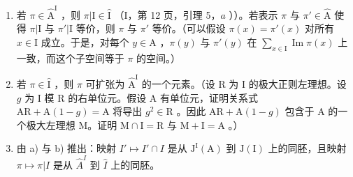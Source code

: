\begin{enumerate}
\def\labelenumi{\alph{enumi})}
\item
  若 \(\pi \in \widehat{\mathrm{A}}^{\mathrm{I}}\) ，则 \(\pi | \mathrm{I} \in \widehat{\mathrm{I}}\) （I，第 12 页，引理 5，\(a\) ））。若表示 \(\pi\) 与 \(\pi' \in \widehat{\mathrm{A}}\) 使得 \(\pi | \mathrm{I}\) 与 \(\pi'|\mathrm{I}\) 等价，则 \(\pi\) 与 \(\pi'\) 等价。（可以假设 \(\pi(x) = \pi'(x)\) 对所有 \(x \in \mathrm{I}\) 成立。于是，对每个 \(y \in \mathrm{A}\) ，\(\pi(y)\) 与 \(\pi'(y)\) 在 \(\sum_{x \in \mathrm{I}} \operatorname{Im} \pi(x)\) 上一致，而这个子空间等于 \(\pi\) 的空间。）
\item
  若 \(\pi \in \widehat{\mathrm{I}}\) ，则 \(\pi\) 可扩张为 \(\widehat{\mathrm{A}}^{\mathrm{I}}\) 的一个元素。（设 R 为 I 的极大正则左理想。设 \(g\) 为 I 模 R 的右单位元。假设 A 有单位元，证明关系式 \(\mathrm{AR} + \mathrm{A}(1 - g) = \mathrm{A}\) 将导出 \(g^2 \in \mathrm{R}\) 。因此 \(\mathrm{AR} + \mathrm{A}(1 - g)\) 包含于 A 的一个极大左理想 M。证明 \(\mathrm{M} \cap \mathrm{I} = \mathrm{R}\) 与 \(\mathrm{M} + \mathrm{I} = \mathrm{A}\) 。）
\item
  由 a) 与 b) 推出：映射 \(I'\mapsto I'\cap I\) 是从 \(\mathrm{J}^{\mathrm{I}}(\mathrm{A})\) 到 \(\mathrm{J}(\mathrm{I})\) 上的同胚，且映射 \(\pi\mapsto\pi|I\) 是从 \(\widehat{A}^{I}\) 到 \(\widehat{I}\) 上的同胚。
\end{enumerate}
